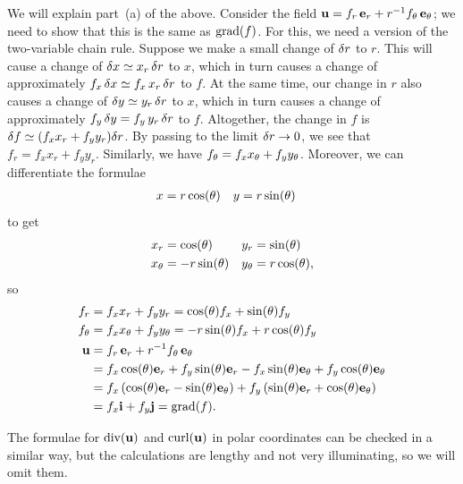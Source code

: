 \documentclass[reqno]{amsart}
\theoremstyle{definition}
\begin{document}
We will explain part~(a) of the above.  Consider the field
$\mathbf{u}=f_r\,\mathbf{e}_r+r^{-1}f_\theta\,\mathbf{e}_\theta$; we need to show that this is
the same as $\operatorname{grad}(f)$.  For this, we need a version of the
two-variable chain rule.  Suppose we make a small change of $\delta r$ to
$r$.  This will cause a change of $\delta x\simeq x_r\,\delta r$ to $x$,
which in turn causes a change of approximately 
$f_x\,\delta x\simeq f_x\,x_r\,\delta r$ to $f$.  At the same time, our
change in $r$ also causes a change of $\delta y\simeq y_r\,\delta r$ to $x$,
which in turn causes a change of approximately 
$f_y\,\delta y=f_y\,y_r\,\delta r$ to $f$.  Altogether, the change in $f$ is
$\delta f\simeq(f_xx_r+f_yy_r)\delta r$.  By passing to the limit 
$\delta r\to 0$, we see that $f_r=f_xx_r+f_yy_r$.  Similarly, we have
$f_\theta=f_xx_\theta+f_yy_\theta$.  Moreover, we can differentiate the
formulae 
\begin{align*}
 x &= r\cos(\theta) & y &= r\sin(\theta) 
\end{align*}
to get 
\begin{align*}
 x_r &= \cos(\theta) & y_r &= \sin(\theta) \\
 x_\theta &= -r\sin(\theta) & y_\theta &= r\cos(\theta),
\end{align*}
so 
\begin{align*}
 f_r &= f_xx_r + f_yy_r = \cos(\theta)f_x + \sin(\theta)f_y \\
 f_\theta &= f_xx_\theta + f_yy_\theta 
         = -r\sin(\theta)f_x + r\cos(\theta)f_y \\
 \mathbf{u} &= f_r\,\mathbf{e}_r+r^{-1}f_\theta\,\mathbf{e}_\theta \\
     &= f_x\cos(\theta)\mathbf{e}_r +f_y\sin(\theta)\mathbf{e}_r 
        -f_x\sin(\theta)\mathbf{e}_\theta + f_y\cos(\theta)\mathbf{e}_\theta \\
     &= f_x\,(\cos(\theta)\mathbf{e}_r-\sin(\theta)\mathbf{e}_\theta) + 
        f_y\,(\sin(\theta)\mathbf{e}_r+\cos(\theta)\mathbf{e}_\theta) \\
     &= f_x\mathbf{i} + f_y\mathbf{j} = \operatorname{grad}(f).
\end{align*}

The formulae for $\operatorname{div}(\mathbf{u})$ and $\operatorname{curl}(\mathbf{u})$ in polar coordinates can
be checked in a similar way, but the calculations are lengthy and not
very illuminating, so we will omit them.
\end{document}
